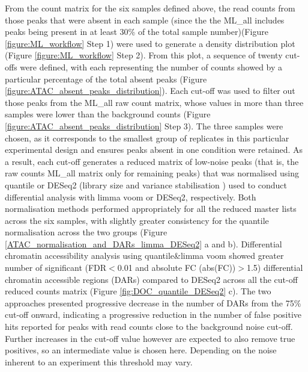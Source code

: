 From the count matrix for the six samples defined above, the read counts from those peaks that were absent in each sample (since the the ML\_all includes peaks being present in at least 30\% of the total sample number)(Figure \ref{figure:ML_workflow} Step 1) were used to generate a density distribution plot (Figure \ref{figure:ML_workflow} Step 2). From this plot, a sequence of twenty cut-offs were defined, with each representing the number of counts showed by a particular percentage of the total absent peaks (Figure \ref{figure:ATAC_absent_peaks_distribution}). Each cut-off was used to filter out those peaks from the ML\_all raw count matrix, whose values in more than three samples were lower than the background counts (Figure \ref{figure:ATAC_absent_peaks_distribution} Step 3). The three samples were chosen, as it corresponds to the smallest group of replicates in this particular experimental design and ensures peaks absent in one condition were retained. As a result, each cut-off generates a reduced matrix of low-noise peaks (that is, the raw counts ML\_all matrix only for remaining peaks) that was normalised using quantile or DESeq2 (library size and variance stabilisation \parencite{Love2014}) used to conduct differential analysis with limma voom or DESeq2, respectively. Both normalisation methods performed appropriately for all the reduced master lists across the six samples, with slightly greater consistency for the quantile normalisation across the two groups (Figure \ref{ATAC_normalisation_and_DARs_limma_DESeq2} a and b). Differential chromatin accessibility analysis using quantile\&limma voom showed greater number of significant (FDR$<$0.01 and absolute FC (abs(FC))$>$1.5) differential chromatin accessible regions (DARs) compared to DESeq2 across all the cut-off reduced counts matrix (Figure \ref{fig:DOC_quantile_DESeq2} c). The two approaches presented progressive decrease in the number of DARs from the 75\% cut-off onward, indicating a progressive reduction in the number of false positive hits reported for peaks with read counts close to the background noise cut-off. Further increases in the cut-off value however are expected to also remove true positives, so an intermediate value is chosen here. Depending on the noise inherent to an experiment this threshold may vary. 

